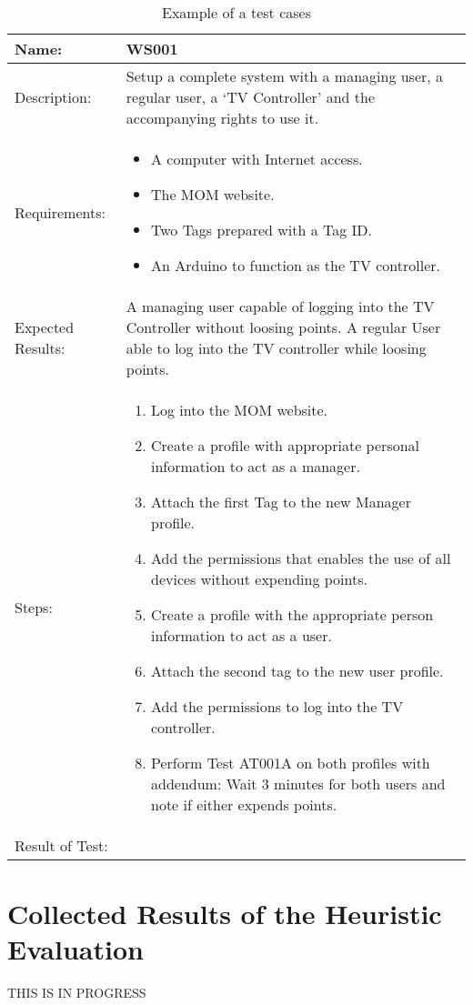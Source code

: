 \begin{table}[h]
\label{tab:testcase}
\caption{Example of a test cases}
	\centering
		\begin{tabular*}{\textwidth}{|l|l|}
		\hline
		\hline
		Name: & \parbox{0.6\textwidth}{WS001}\\
		\hline
		Description: & \parbox{0.70\textwidth}{Setup a complete system with a managing user, a regular user,  a `TV Controller' and the accompanying rights to use it.}\\
		\hline
		Requirements: & \parbox{0.70\textwidth}{
		\begin{itemize}
			\item A computer with Internet access.
			\item The MOM website.
			\item Two Tags prepared with a Tag ID.
			\item An Arduino to function as the TV controller. 
		\end{itemize}}
		\\
		\hline
		Expected Results: & \parbox{0.70\textwidth}{A managing user capable of logging into the TV Controller without loosing points. A regular User able to log into the TV controller while loosing points.}\\
		\hline
		Steps: & \parbox{0.70\textwidth}{
		\begin{enumerate}
			\item Log into the MOM website.
			\item Create a profile with appropriate personal information to act as a manager.
			\item Attach the first Tag to the new Manager profile.
			\item Add the permissions that enables the use of all devices without expending points.
			\item Create a profile with the appropriate person information to act as a user.
			\item Attach the second tag to the new user profile.
			\item Add the permissions to log into the TV controller.
			\item Perform Test AT001A on both profiles with addendum: Wait 3 minutes for both users and note if either expends points.
		\end{enumerate}}
		\\		
		\hline
		Result of Test: & \\
		\hline
		\end{tabular*}
\end{table}


\section{Collected Results of the Heuristic Evaluation}
THIS IS IN PROGRESS